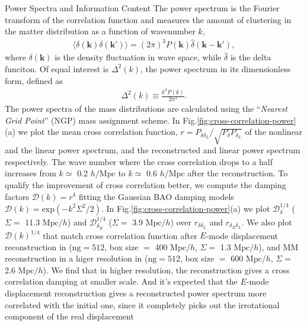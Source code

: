 \begin{section}{Power Spectra and Information Content}
  \label{sec:fisherinfo}
    The power spectrum is the Fourier transform of the correlation function and measures
 the amount of clustering in the matter distribution as a function of wavenumber $k$,
\begin{align}
    \langle \delta \left( \bm{k} \right) \delta \left( \bm{k'}\right) \rangle =
\left( 2\pi \right) ^3 P \left( \bm{k} \right) \hat{\delta} \left( \bm{k}-\bm{k'} \right),
\end{align}
where $\delta \left( \bm{k} \right)$ is the density fluctuation in wave space, while 
$\hat{\delta}$ is the delta funciton. Of equal interest is $\Delta ^2(k)$, the power 
spectrum in its dimensionless form, defined as
\begin{align}
    \Delta ^2(k) \equiv \frac{k^3 P \left( k \right)}{2\pi ^2}.
\end{align}
    The power spectra of the mass distributions are calculated using the \enquote{\textit{Nearest Grid Point}} 
(NGP) mass assignment scheme. In Fig.\ref{fig:cross-correlation-power}(a) we plot the mean cross correlation 
function, $r=P_{\delta \delta_L}/\sqrt{P_\delta P_{\delta_L}}$ of the nonlinear and the 
linear power spectrum, and the reconstructed and 
linear power spectrum respectively. The wave number where the cross correlation drops to a half increases 
from $k\simeq$ 0.2 $h/\mathrm{Mpc}$ to $k \simeq$ 0.6 $h/\mathrm{Mpc}$ after the reconstruction. 
To qualify the improvement of cross correlation better, 
we compute the damping factors $\mathcal{D}(k)=r^4$ fitting the Gaussian BAO damping models 
$\mathcal{D}(k)=\mathrm{exp}(-k^2 \Sigma^2/2)$. In Fig.\ref{fig:cross-correlation-power}(a) 
we plot $\mathcal{D}_\delta^{1/4}$ ($\Sigma =$ 11.3 $\mathrm{Mpc}/h$) and $\mathcal{D}_{\delta_R}^{1/4}$ 
($\Sigma = $ 3.9 $\mathrm{Mpc}/h$) over $r_{\delta\delta_L}$ and $r_{\delta_R\delta_L}$. 
We also plot $\mathcal{D}(k)^{1/4}$ 
that match cross correlation function after $E$-mode displacement 
reconstruction in \cite{bib:Yu2016} ($\mathrm{ng}=512$, box size $=$ 400 $\mathrm{Mpc}/h$, $\Sigma =$ 1.3 $\mathrm{Mpc}/h$), and 
MM reconstruction in a higer resolution in \cite{bib:ZhuH2016} ($\mathrm{ng}=512$, 
box size $=$ 600 $\mathrm{Mpc}/h$, $\Sigma =$ 2.6 $\mathrm{Mpc}/h$). 
We find that in higher resolution, 
the reconstruction gives a cross correlation damping at smaller scale. 
And it's expected that the $E$-mode displacement reconstruction gives a reconstructed power spectrum more correlated 
with the initial one, since it completely picks out the irrotational component of the real displacement 

\end{section}
